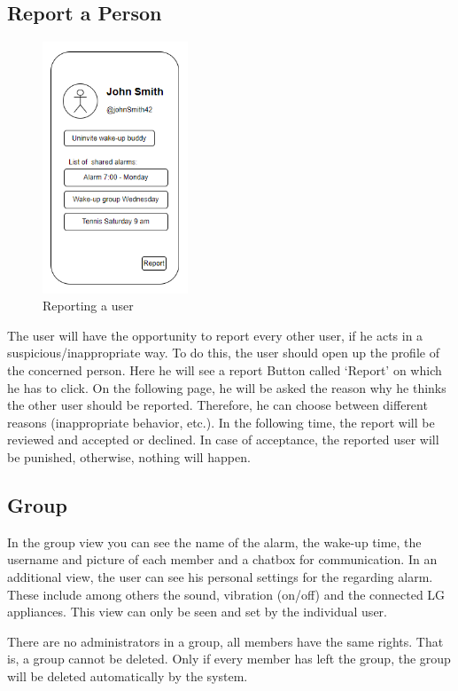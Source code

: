 \documentclass[conference]{IEEEtran}
\begin{document}
\subsection{Report a Person}
\begin{figure}[htbp]
    \centerline{\includegraphics[height=75mm,scale=0.5]{Images/report.png}}
    \caption{Reporting a user}
    \label{fig}
\end{figure}

The user will have the opportunity to report every other user, if he acts in a suspicious/inappropriate way. To do this, the user should open up the profile of the concerned person. Here he will see a report Button called ‘Report’ on which he has to click. On the following page, he will be asked the reason why he thinks the other user should be reported. Therefore, he can choose between different reasons (inappropriate behavior, etc.). In the following time, the report will be reviewed and accepted or declined. In case of acceptance, the reported user will be punished, otherwise, nothing will happen.

    
    
\subsection{Group}
In the group view you can see the name of the alarm, the wake-up time, the username and picture of each member and a chatbox for communication. 
In an additional view, the user can see his personal settings for the regarding alarm. These include among others the sound, vibration (on/off) and the connected LG appliances. This view can only be seen and set by the individual user. 

There are no administrators in a group, all members have the same rights. That is, a group cannot be deleted. Only if every member has left the group, the group will be deleted automatically by the system.
\end{document}
